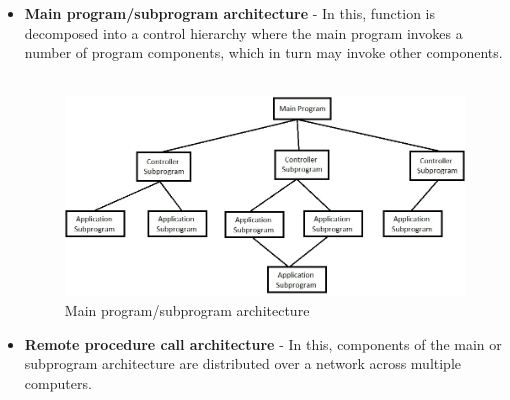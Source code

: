\documentclass{article}
\begin{document}
\begin{itemize}

\item \textbf{Main program/subprogram architecture} - In this, function is decomposed into a control hierarchy where the main program invokes a number of program components, which in turn may invoke other components.\\\\

\begin{figure}[h]
\centering
\includegraphics[scale=0.5]{c&r.jpg}
\caption{Main program/subprogram architecture}
\label{fig_c&r}
\end{figure}


\item \textbf{Remote procedure call architecture} - In this, components of the main or subprogram architecture are distributed over a network across multiple computers.

\end{itemize}
\newpage
\end{document}
